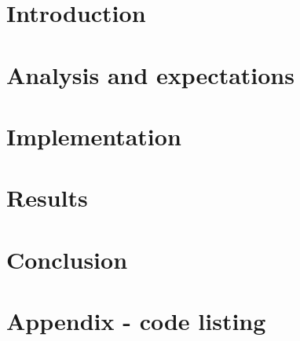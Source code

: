\documentclass[12pt,a4paper]{article}
\title{}
\author{Carlos Requena López}
\begin{document}
\maketitle
\thispagestyle{empty}
\tableofcontents
\newpage
\pagestyle{fancy}
\setcounter{page}{1}


\section{Introduction}

\section{Analysis and expectations}

\section{Implementation}

\section{Results}

\section{Conclusion}


\appendix
\section{Appendix - code listing}

\begin{verbatim}
\end{verbatim}
\end{document}
